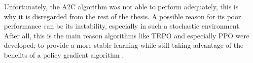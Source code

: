 Unfortunately, the \gls{A2C} algorithm was not able to perform adequately, this is why it is disregarded from the rest of the thesis. A possible reason for its poor performance can be its instability, especially in such a stochastic environment. After all, this is the main reason algorithms like \gls{TRPO} and especially \gls{PPO} were developed; to provide a more stable learning while still taking advantage of the benefits of a policy gradient algorithm \cite{schulman2017proximal}.
